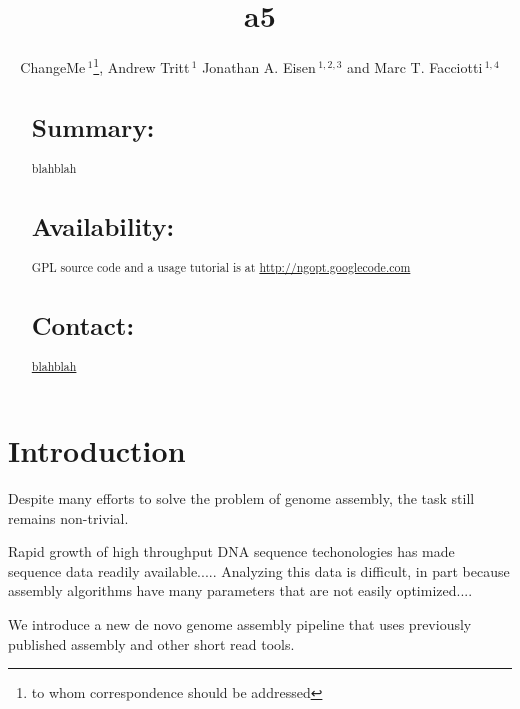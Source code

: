 \documentclass{bioinfo}
\begin{document}

\title[a5]{a5}
\author[ChangeMe \textit{et~al}]{ChangeMe\,$^{1}$\footnote{to whom correspondence should be addressed}, Andrew Tritt\,$^{1}$ Jonathan A. Eisen\,$^{1,2,3}$ and Marc T. Facciotti\,$^{1,4}$}
\address{$^{1}$Genome Center, $^{2}$ Dept. of Evolution and Ecology, $^{3}$ Medical Microbiology and Immunology, 
$^{4}$ Biomedical Engineering, University of California-Davis, Davis, CA 95616.}



\maketitle

\begin{abstract}

\section{Summary:}
blahblah
\section{Availability:}
GPL source code and a usage tutorial is at \href{http://ngopt.googlecode.com}{http://ngopt.googlecode.com}

\section{Contact:} \href{blahblah}{blahblah}
\end{abstract}

\section{Introduction}
Despite many efforts to solve the problem of genome assembly, the task still remains non-trivial. 

Rapid growth of high throughput DNA sequence techonologies has made sequence 
data readily available..... Analyzing this data is difficult, in part because 
assembly algorithms have many parameters that are not easily optimized.... 

We introduce a new de novo genome assembly pipeline that uses previously 
published assembly and other short read tools. 
\end{document}
